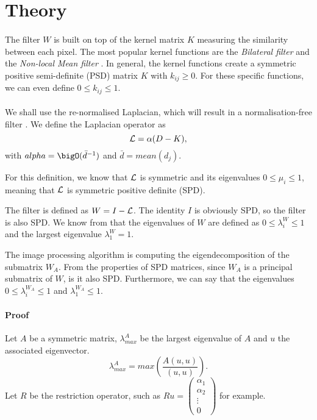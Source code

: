 \section{Theory}

\paragraph{}
The filter \(W\) is built on top of the kernel matrix \(K\) measuring the similarity between each pixel.
The most popular kernel functions are the \textit{Bilateral filter} \cite{bilateral_tomasi_1998} and the \textit{Non-local Mean filter} \cite{kervrann_nlm_2006}.
In general, the kernel functions create a symmetric positive semi-definite (PSD) matrix $K$ with \(k_{ij} \ge 0\).
For these specific functions, we can even define \(0 \le k_{ij} \le 1\).

\paragraph{}
We shall use the re-normalised \cite{siam_slides_2016} Laplacian, which will result in a normalisation-free filter \cite{milanfar_new_2016}.
We define the Laplacian operator as
\[\operatorname{\mathcal{L}} = \alpha (D - K),\]
with \(alpha = \bigO(\bar{d}^{-1})\) and \(\bar{d} = mean(d_{j})\).

For this definition, we know that \(\operatorname{\mathcal{L}}\) is symmetric and its eigenvalues \(0 \le \mu_i \le 1\), meaning that \(\operatorname{\mathcal{L}}\) is symmetric positive definite (SPD).

The filter is defined as \(W = I - \operatorname{\mathcal{L}}\). The identity \(I\) is obviously SPD, so the filter is also SPD.
We know from \cite{glide_2014} that the eigenvalues of \(W\) are defined as \(0 \le \lambda^W_i \le 1\) and the largest eigenvalue \(\lambda^W_1 = 1\).

The image processing algorithm is computing the eigendecomposition of the submatrix \(W_A\).
From the properties of SPD matrices, since \(W_A\) is a principal submatrix of \(W\), is it also SPD.
Furthermore, we can say that the eigenvalues \(0 \le \lambda^{W_A}_i \le 1\) and \(\lambda^{W_A}_1 \le 1\).

\paragraph{Proof}
Let \(A\) be a symmetric matrix, \(\lambda^A_{max}\) be the largest eigenvalue of \(A\) and \(u\) the associated eigenvector.
\[\lambda^A_{max} = max(\frac{A(u, u)}{(u, u)}).\]
Let \(R\) be the restriction operator, such as \(Ru = \begin{pmatrix}\alpha_1 \\ \alpha_2 \\ \vdots \\ 0 \end{pmatrix}\) for example.

